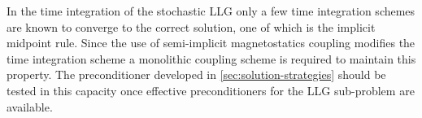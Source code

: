 In the time integration of the stochastic LLG only a few time integration schemes are known to converge to the correct solution, one of which is the implicit midpoint rule.
Since the use of semi-implicit magnetostatics coupling modifies the time integration scheme a monolithic coupling scheme is required to maintain this property.
The preconditioner developed in \cref{sec:solution-strategies} should be tested in this capacity once effective preconditioners for the LLG sub-problem are available.



